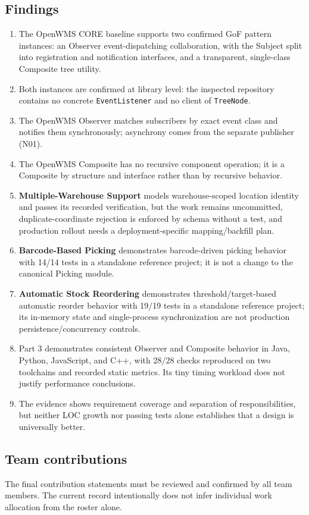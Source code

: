 \documentclass[11pt,a4paper]{article}
\newcommand{\code}[1]{\nolinkurl{#1}}
\begin{document}
\subsection{Findings}
\begin{enumerate}[leftmargin=*,nosep]
\item The OpenWMS CORE baseline supports two confirmed GoF pattern instances: an Observer event-dispatching collaboration, with the Subject split into registration and notification interfaces, and a transparent, single-class Composite tree utility.
\item Both instances are confirmed at library level: the inspected repository contains no concrete \code{EventListener} and no client of \code{TreeNode}.
\item The OpenWMS Observer matches subscribers by exact event class and notifies them synchronously; asynchrony comes from the separate publisher (N01).
\item The OpenWMS Composite has no recursive component operation; it is a Composite by structure and interface rather than by recursive behavior.
\item \textbf{Multiple-Warehouse Support} models warehouse-scoped location identity and passes its recorded verification, but the work remains uncommitted, duplicate-coordinate rejection is enforced by schema without a test, and production rollout needs a deployment-specific mapping/backfill plan.
\item \textbf{Barcode-Based Picking} demonstrates barcode-driven picking behavior with 14/14 tests in a standalone reference project; it is not a change to the canonical Picking module.
\item \textbf{Automatic Stock Reordering} demonstrates threshold/target-based automatic reorder behavior with 19/19 tests in a standalone reference project; its in-memory state and single-process synchronization are not production persistence/concurrency controls.
\item Part 3 demonstrates consistent Observer and Composite behavior in Java, Python, JavaScript, and C++, with 28/28 checks reproduced on two toolchains and recorded static metrics. Its tiny timing workload does not justify performance conclusions.
\item The evidence shows requirement coverage and separation of responsibilities, but neither LOC growth nor passing tests alone establishes that a design is universally better.
\end{enumerate}

\subsection{Team contributions}
The final contribution statements must be reviewed and confirmed by all team members. The current record intentionally does not infer individual work allocation from the roster alone.
\end{document}
